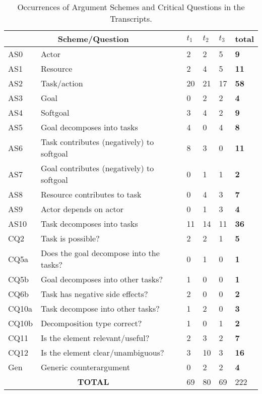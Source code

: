 \begin{table}[t]
\centering
\begin{tabularx}{0.5\textwidth}{|l|X|l|l|l|>{\bfseries}l|}
\hline
\multicolumn{2}{|c|}{\textbf{Scheme/Question}} & $t_1$ & $t_2$ & $t_3$ & \textbf{total}\\
\hline 
AS0 & Actor & 2 & 2 & 5 & 9\\
\hline
AS1 & Resource & 2 & 4 & 5 & 11\\
\hline
AS2 & Task/action & 20 & 21 & 17 & 58\\
\hline
AS3 & Goal & 0 & 2 & 2 & 4\\
\hline
AS4 & Softgoal & 3 & 4 & 2 & 9\\
\hline
AS5 & Goal decomposes into tasks & 4 &0& 4 & 8\\
\hline
AS6 & Task contributes (negatively) to softgoal & 8 & 3 &0& 11\\
\hline
AS7 & Goal contributes (negatively) to softgoal &0& 1 & 1 & 2\\
\hline
AS8 & Resource contributes to task & 0 & 4 & 3 & 7\\
\hline
AS9 & Actor depends on actor &0& 1 & 3 & 4\\
\hline
AS10 & Task decomposes into tasks & 11 &14 &11 &36\\ 
\hline
\hline
CQ2 & Task is possible? & 2 & 2 & 1 & 5\\
\hline		
CQ5a & Does the goal decompose into the tasks? & 0 & 1 & 0 & 1\\
\hline
CQ5b & Goal decomposes into other tasks? & 1 & 0 & 0 & 1\\
\hline
CQ6b & Task has negative side effects? & 2 & 0 & 0 & 2\\
\hline
CQ10a & Task decompose into other tasks? & 1 &2 &0&3\\
\hline
CQ10b & Decomposition type correct? &1 &0& 1 &2\\
\hline
\hline
CQ11 & Is the element relevant/useful? & 2 & 3 & 2 &7\\
\hline
CQ12 & Is the element clear/unambiguous? &3 &10 & 3 & 16\\
\hline
\hline
Gen & Generic counterargument & 0& 2 & 2 & 4\\
\hline
\hline
\multicolumn{2}{|c|}{\textbf{TOTAL}}&69&80&69&222\\
\hline
\end{tabularx}
\caption{Occurrences of Argument Schemes and Critical Questions in the Transcripts.}
\label{table:transcripts:results:argumentschemes}
\end{table}

